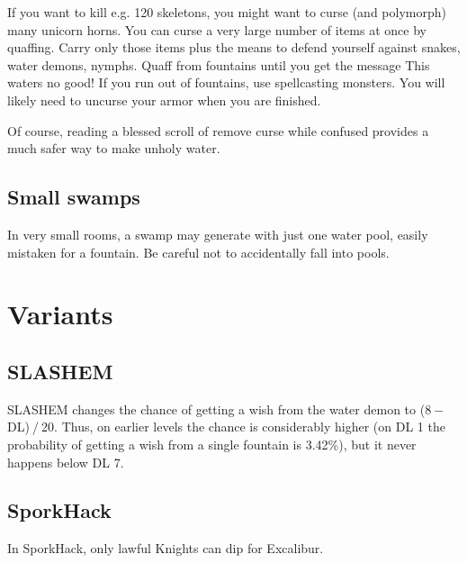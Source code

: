 If you want to kill e.g. 120 skeletons\footnotemark[132], you might want to curse (and polymorph) many unicorn horns. You can curse a very large number of items at once by quaffing. Carry only those items plus the means to defend yourself against snakes, water demons, nymphs. Quaff from fountains until you get the message This water\textquotesingle{}s no good! If you run out of fountains, use spellcasting monsters. You will likely need to uncurse your armor when you are finished.


Of course, reading a blessed scroll of remove curse\footnotemark[133] while confused provides a much safer way to make unholy water.



\subsection{Small swamps}
\label{17}
In very small rooms, a swamp\footnotemark[134] may generate with just one water pool\footnotemark[135], easily mistaken for a fountain. Be careful not to accidentally fall into pools.



\section{Variants}
\label{18}
\subsection{SLASH\textquotesingle{}EM}
\label{19}
SLASH\textquotesingle{}EM\footnotemark[136] changes the chance of getting a wish from the water demon to (8{\mbox{$~$}}{\mbox{$-$}}{\mbox{$~$}}DL){\mbox{$~$}}/{\mbox{$~$}}20. Thus, on earlier levels the chance is considerably higher (on DL 1 the probability of getting a wish from a single fountain is 3.42\%), but it never happens below DL 7.



\subsection{SporkHack}
\label{20}
In SporkHack\footnotemark[137], only lawful Knights\footnotemark[138] can dip for Excalibur\footnotemark[139].



